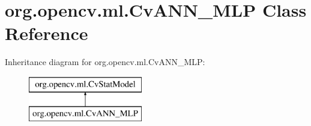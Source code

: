 \hypertarget{classorg_1_1opencv_1_1ml_1_1_cv_a_n_n___m_l_p}{}\section{org.\+opencv.\+ml.\+Cv\+A\+N\+N\+\_\+\+M\+LP Class Reference}
\label{classorg_1_1opencv_1_1ml_1_1_cv_a_n_n___m_l_p}
Inheritance diagram for org.\+opencv.\+ml.\+Cv\+A\+N\+N\+\_\+\+M\+LP\+:\begin{figure}[H]
\begin{center}
\leavevmode
\includegraphics[height=2.000000cm]{classorg_1_1opencv_1_1ml_1_1_cv_a_n_n___m_l_p}
\end{center}
\end{figure}
